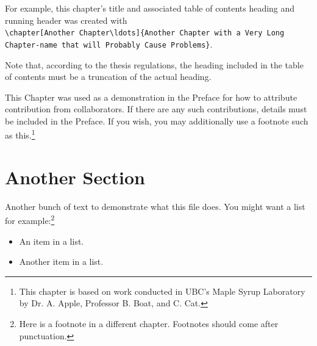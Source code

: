 \documentclass[msc,oneside]{ubcthesis}
\theoremstyle{definition}
\begin{document}
For example, this chapter's title and associated table of contents heading and
running header was created with\\
\verb|\chapter[Another Chapter\ldots]{Another Chapter with a Very Long|\\
\verb|Chapter-name that will Probably Cause Problems}|.

Note that, according to the thesis regulations, the heading included
in the table of contents must be a truncation of the actual heading.

This Chapter was used as a demonstration in the Preface for how to
attribute contribution from collaborators.  If there are any such
contributions, details must be included in the Preface.  If you wish,
you may additionally use a footnote such as this.\footnote{This
  chapter is based on work conducted in UBC's Maple Syrup Laboratory
  by Dr. A. Apple, Professor B. Boat, and C. Cat.}

\section{Another Section}
Another bunch of text to demonstrate what this file does.
You might want a list for example:\footnote{Here is a footnote in a
  different chapter.  Footnotes should come after punctuation.}
\begin{itemize}
\item An item in a list.
\item Another item in a list.
\end{itemize}
\end{document}
